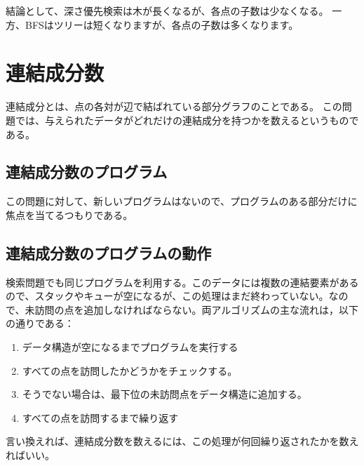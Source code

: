 \documentclass[a4j, titlepage]{jarticle}
\begin{document}
    結論として、深さ優先検索は木が長くなるが、各点の子数は少なくなる。
    一方、BFSはツリーは短くなりますが、各点の子数は多くなります。


    
\section{連結成分数}
連結成分とは、点の各対が辺で結ばれている部分グラフのことである。
この問題では、与えられたデータがどれだけの連結成分を持つかを数えるというものである。
    
    \subsection{連結成分数のプログラム}
    この問題に対して、新しいプログラムはないので、プログラムのある部分だけに焦点を当てるつもりである。

    \subsection{連結成分数のプログラムの動作}
    検索問題でも同じプログラムを利用する。このデータには複数の連結要素があるので、スタックやキューが空になるが、この処理はまだ終わっていない。なので、未訪問の点を追加しなければならない。両アルゴリズムの主な流れは，以下の通りである：
    \begin{screen}
        \begin{enumerate}
            \item データ構造が空になるまでプログラムを実行する
            \item すべての点を訪問したかどうかをチェックする。
            \item そうでない場合は、最下位の未訪問点をデータ構造に追加する。
            \item すべての点を訪問するまで繰り返す
        \end{enumerate}
    \end{screen}
    言い換えれば、連結成分数を数えるには、この処理が何回繰り返されたかを数えればいい。
    
\end{document}
